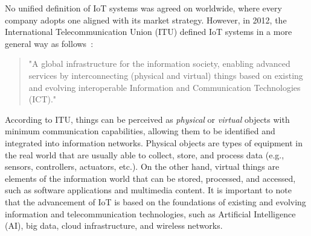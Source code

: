 \documentclass[]{IEEEtran}
\begin{document}
No unified definition of IoT systems was agreed on worldwide, where every company adopts one aligned with its market strategy.
However, in 2012, the International Telecommunication Union (ITU) defined IoT systems in a more general way as follows~\cite{itu-t_overview_2012_Y.2060}:
\begin{quote}
"A global infrastructure for the information society, enabling advanced services by interconnecting (physical and virtual) things based on existing and evolving interoperable Information and Communication Technologies (ICT)."
\end{quote}
According to ITU, things can be perceived as \textit{physical} or \textit{virtual} objects with minimum communication capabilities, allowing them to be identified and integrated into information networks.
Physical objects are types of equipment in the real world that are usually able to collect, store, and process data (e.g., sensors, controllers, actuators, etc.).
On the other hand, virtual things are elements of the information world that can be stored, processed, and accessed, such as software applications and multimedia content.
It is important to note that the advancement of IoT is based on the foundations of existing and evolving information and telecommunication technologies, such as Artificial Intelligence (AI), big data, cloud infrastructure, and wireless networks.
\end{document}
